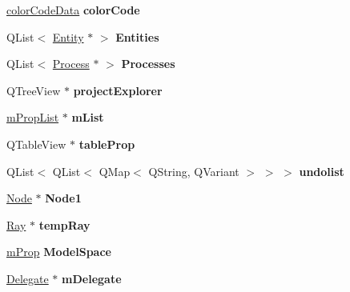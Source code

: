 \begin{DoxyCompactItemize}
\hyperlink{structcolor_code_data}{color\+Code\+Data} {\bfseries color\+Code}
\item 
\mbox{\label{class_graph_widget_abfb0a8186032e32c3b0c03eb953e2452}} 
Q\+List$<$ \hyperlink{class_entity}{Entity} $\ast$ $>$ {\bfseries Entities}
\item 
\mbox{\label{class_graph_widget_a97be14dd86070a1d854eff597657621a}} 
Q\+List$<$ \hyperlink{class_process}{Process} $\ast$ $>$ {\bfseries Processes}
\item 
\mbox{\label{class_graph_widget_a20b5262f7b7622f7a41d33060b41c700}} 
Q\+Tree\+View $\ast$ {\bfseries project\+Explorer}
\item 
\mbox{\label{class_graph_widget_a555956acf7ef4119f610f8d8d85e998e}} 
\hyperlink{classm_prop_list}{m\+Prop\+List} $\ast$ {\bfseries m\+List}
\item 
\mbox{\label{class_graph_widget_afd918663c58c2e2179b195c9f96b5f1a}} 
Q\+Table\+View $\ast$ {\bfseries table\+Prop}
\item 
\mbox{\label{class_graph_widget_ac9fdd9434c36ca03893de7552ba142ba}} 
Q\+List$<$ Q\+List$<$ Q\+Map$<$ Q\+String, Q\+Variant $>$ $>$ $>$ {\bfseries undolist}
\item 
\mbox{\label{class_graph_widget_a17aa6424cc2863313c05f1dfb6ca2230}} 
\hyperlink{class_node}{Node} $\ast$ {\bfseries Node1}
\item 
\mbox{\label{class_graph_widget_a92c1cd5a8fe7e0426a745f5cbafc75b2}} 
\hyperlink{class_ray}{Ray} $\ast$ {\bfseries temp\+Ray}
\item 
\mbox{\label{class_graph_widget_a1ec9353287f825c76d97715fad33a4dd}} 
\hyperlink{classm_prop}{m\+Prop} {\bfseries Model\+Space}
\item 
\mbox{\label{class_graph_widget_aadea7a05529fab7c8a367bc36929d921}} 
\hyperlink{class_delegate}{Delegate} $\ast$ {\bfseries m\+Delegate}
\item 
\mbox{\label{class_graph_widget_aa8eef8aa881d63cc9c67950b86799220}} 

\end{DoxyCompactItemize}
